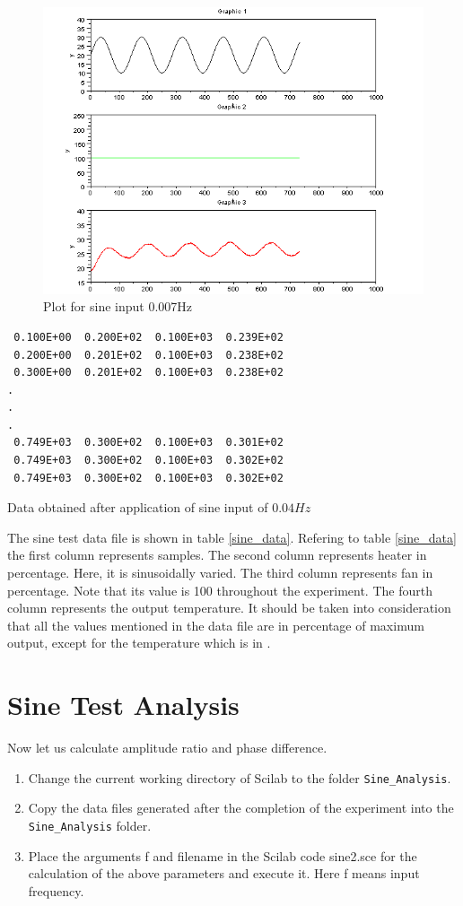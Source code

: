 \begin{figure}
\includegraphics[width=\linewidth]{sinetest_manual/sine_resp.png}
\caption{Plot for sine input 0.007Hz}
\label{fig:scope}
\end{figure}
\begin{table}

\begin{verbatim}
 0.100E+00  0.200E+02  0.100E+03  0.239E+02
 0.200E+00  0.201E+02  0.100E+03  0.238E+02
 0.300E+00  0.201E+02  0.100E+03  0.238E+02
.
.
.
 0.749E+03  0.300E+02  0.100E+03  0.301E+02
 0.749E+03  0.300E+02  0.100E+03  0.302E+02
 0.749E+03  0.300E+02  0.100E+03  0.302E+02
\end{verbatim}
\caption{Data obtained after application of sine input of $0.04Hz$}
\label{sine_data}
\end{table}
The sine test data file is shown in table \ref{sine_data}. Refering to table \ref{sine_data} the first column represents samples. 
The second column represents heater in percentage. Here, it is sinusoidally varied. 
The third column represents fan in percentage. Note that its value is 100 throughout the experiment. 
The fourth column represents the output temperature.
It should be taken into consideration that all the values mentioned in the data file are in percentage of maximum output,
except for the temperature which is in \textcelsius. 

\section{Sine Test Analysis}
Now let us calculate amplitude ratio and phase difference. 
\begin{enumerate}
 \item Change the current working directory of Scilab to the 
folder {\tt Sine\_Analysis}.
\item Copy the data files generated after the completion of the experiment into the 
{\tt Sine\_Analysis} folder.
\item Place the arguments {\ttfamily f} and {\ttfamily filename} in the Scilab code 
{\ttfamily sine2.sce} for the calculation of the above parameters and execute it. Here {\ttfamily f}
means input frequency.
\end{enumerate}


